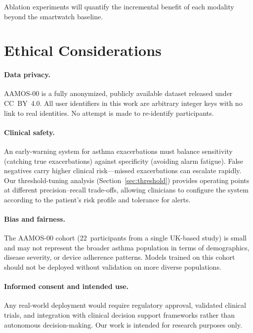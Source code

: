 \documentclass[11pt,a4paper]{article}
\begin{document}
Ablation experiments will quantify the incremental benefit of each modality
beyond the smartwatch baseline.

\section{Ethical Considerations}\label{sec:ethics}

\paragraph{Data privacy.}
AAMOS-00 is a fully anonymized, publicly available dataset released under
CC~BY~4.0.  All user identifiers in this work are arbitrary integer keys with
no link to real identities.  No attempt is made to re-identify participants.

\paragraph{Clinical safety.}
An early-warning system for asthma exacerbations must balance sensitivity
(catching true exacerbations) against specificity (avoiding alarm fatigue).
False negatives carry higher clinical risk—missed exacerbations can escalate
rapidly.  Our threshold-tuning analysis (Section~\ref{sec:threshold}) provides
operating points at different precision–recall trade-offs, allowing clinicians
to configure the system according to the patient's risk profile and tolerance
for alerts.

\paragraph{Bias and fairness.}
The AAMOS-00 cohort (22~participants from a single UK-based study) is small and
may not represent the broader asthma population in terms of demographics,
disease severity, or device adherence patterns.  Models trained on this cohort
should not be deployed without validation on more diverse populations.

\paragraph{Informed consent and intended use.}
Any real-world deployment would require regulatory approval, validated clinical
trials, and integration with clinical decision support frameworks rather than
autonomous decision-making.  Our work is intended for research purposes only.
\end{document}
